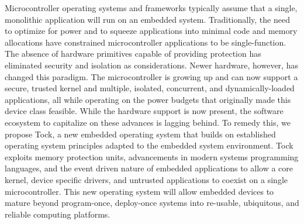 

Microcontroller operating systems and frameworks typically assume that a single,
monolithic application will run on an embedded system.
Traditionally, the need to optimize for power and to squeeze applications into
minimal code and memory allocations have constrained microcontroller
applications to be single-function.
The absence of hardware primitives capable of providing protection has
eliminated security and isolation as considerations.
Newer hardware, however, has changed this paradigm.
The microcontroller is growing up and can now support a secure, trusted kernel
and multiple, isolated, concurrent, and dynamically-loaded applications, all
while operating on the power budgets that originally made this device class
feasible.
While the hardware support is now present, the software ecosystem to
capitalize on these advances is lagging behind.
To remedy this, we propose Tock, a new embedded operating system that builds
on established operating system principles adapted to the embedded system
environment.
Tock exploits memory protection units, advancements in modern systems
programming languages, and the event driven nature of embedded applications to
allow a core kernel, device specific drivers, and untrusted applications to
coexist on a single microcontroller.
This new operating system will allow embedded devices to mature beyond
program-once, deploy-once systems into re-usable, ubiquitous, and reliable
computing platforms.





